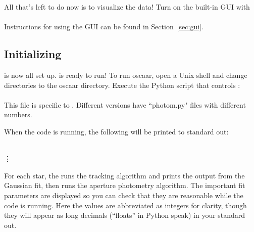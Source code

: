 \documentclass{article}
\begin{document}
All that's left to do now is to visualize the data!  Turn on the built-in GUI with\\

\indent {}\\

\noindent Instructions for using the GUI can be found in Section~\ref{sec:gui}. \\


\subsection{Initializing \oscaar}

 is now all set up. \oscaar  is ready to run! To run oscaar, open a Unix shell and change directories to the oscaar directory. Execute the Python script that controls \oscaar : \\

\indent {} \\

\noindent This file is specific to . Different versions have ``photom.py" files with different numbers. 

When the code is running, the following will be printed to standard out: \\

{\addtolength{\leftskip}{10 mm}
{\scriptsize
\noindent {} \\
 \vdots

	}
}

For each star, the \oscaar  runs the tracking algorithm and prints the output from the Gaussian fit, then runs the aperture photometry algorithm. The important fit parameters are displayed so you can check that they are reasonable while the code is running. Here the values are abbreviated as integers for clarity, though they will appear as long decimals (``floats'' in Python speak) in your standard out. 
\end{document}
